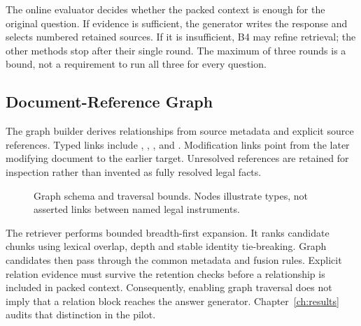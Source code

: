 The online evaluator decides whether the packed context is enough for the original question. If evidence is sufficient, the generator writes the response and selects numbered retained sources. If it is insufficient, B4 may refine retrieval; the other methods stop after their single round. The maximum of three rounds is a bound, not a requirement to run all three for every question.

\subsection{Document-Reference Graph}
The graph builder derives relationships from source metadata and explicit source references. Typed links include , , , and . Modification links point from the later modifying document to the earlier target. Unresolved references are retained for inspection rather than invented as fully resolved legal facts.

\begin{figure}[H]\centering
{}
\caption{Graph schema and traversal bounds. Nodes illustrate types, not asserted links between named legal instruments.}\label{fig:graph}
\end{figure}

The retriever performs bounded breadth-first expansion. It ranks candidate chunks using lexical overlap, depth and stable identity tie-breaking. Graph candidates then pass through the common metadata and fusion rules. Explicit relation evidence must survive the retention checks before a relationship is included in packed context. Consequently, enabling graph traversal does not imply that a relation block reaches the answer generator. Chapter~\ref{ch:results} audits that distinction in the pilot.

